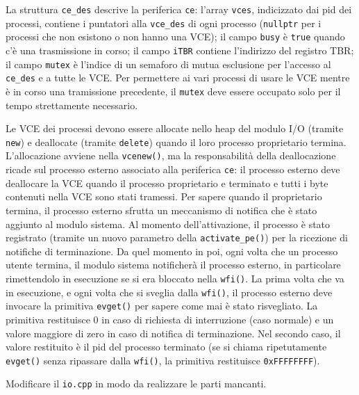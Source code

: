 La struttura \verb|ce_des| descrive la periferica \verb|ce|:
l'array \verb|vces|, indicizzato dai pid dei processi, contiene i puntatori alla \verb|vce_des| di ogni processo
(\verb|nullptr| per i processi che non esistono o non hanno una VCE);
il campo \verb|busy| \`e \verb|true| quando c'\`e una trasmissione in corso; il campo
\verb|iTBR| contiene l'indirizzo del registro TBR;
il campo \verb|mutex| \`e l'indice di un semaforo di mutua esclusione per
l'accesso al \verb|ce_des| e a tutte le VCE\@. Per permettere ai vari processi
di usare le VCE mentre \`e in corso una tramissione precedente, il \verb|mutex|
deve essere occupato solo per il tempo strettamente necessario.

Le VCE dei processi devono essere allocate nello heap del modulo I/O (tramite \verb|new|)
e deallocate (tramite \verb|delete|) quando il loro processo proprietario termina. 
L'allocazione avviene nella \verb|vcenew()|, ma la responsabilit\`a della deallocazione
ricade sul processo esterno associato alla periferica \verb|ce|: il processo esterno deve
deallocare la VCE quando il processo proprietario e terminato e tutti i byte contenuti nella
VCE sono stati tramessi. Per sapere quando il proprietario termina, il processo
esterno sfrutta un meccanismo di notifica che \`e stato aggiunto al modulo sistema.
Al momento dell'attivazione, il processo \`e stato registrato (tramite 
un nuovo parametro della \verb|activate_pe()|) per la ricezione di notifiche di terminazione.
Da quel momento in poi, ogni volta che
un processo utente termina, il modulo sistema notificher\`a il processo esterno, in particolare
rimettendolo in esecuzione se si era bloccato nella \verb|wfi()|.
La prima volta che va in esecuzione, e ogni volta che si sveglia
dalla \verb|wfi()|, il processo esterno deve invocare la primitiva \verb|evget()| per sapere come mai
\`e stato risvegliato. La primitiva restituisce 0 in caso di richiesta di interruzione (caso normale)
e un valore maggiore di zero in caso di notifica di terminazione. Nel secondo caso, il valore restituito
\`e il pid del processo terminato (se si chiama ripetutamente \verb|evget()| senza ripassare dalla \verb|wfi()|,
la primitiva restituisce \verb|0xFFFFFFFF|).

Modificare il \verb|io.cpp| in modo da realizzare le parti mancanti.
